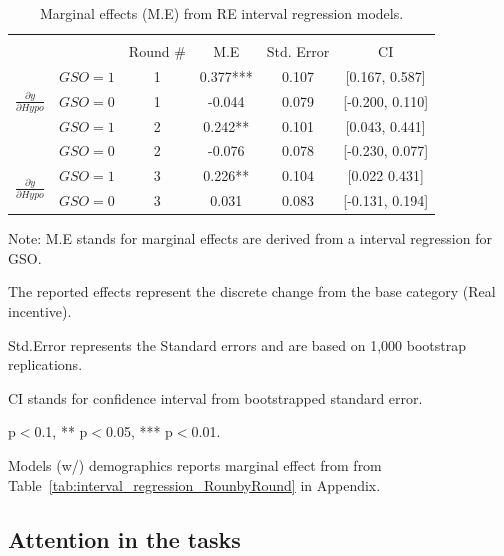\documentclass[12pt]{article}
\begin{document}
\begin{table}[H]
\centering
\footnotesize
\caption{Marginal effects (M.E) from RE interval regression models.}
\label{tab: Learning10}
\begin{tabular}{llcccc}
\toprule
 & &  \\
 & &Round \#& M.E & Std. Error & CI \\ \midrule
{}& $GSO=1$ &  1&0.377*** &  0.107& [0.167, 0.587] \\ & $GSO=0$ &  1& -0.044 & 0.079 & [-0.200, 0.110] \\
                                            \midrule
{} & $GSO=1$ & 2 &0.242** & 0.101 & [0.043, 0.441] \\  & $GSO=0$ &  2 & -0.076& 0.078& [-0.230, 0.077] \\
                                       
                                      \midrule
{}& $GSO=1$ & 3&0.226** & 0.104 & [0.022 0.431] \\  & $GSO=0$ &  3&0.031 & 0.083 & [-0.131, 0.194] \\
                                                     
                             \bottomrule
\end{tabular}
\begin{tablenotes}
\footnotesize
\item Note: M.E stands for marginal effects are derived from a interval regression for GSO.
\item The reported effects represent the discrete change from the base category (Real incentive).
\item Std.Error represents the Standard errors and  are based on 1,000 bootstrap replications.
\item CI stands for confidence interval from bootstrapped standard error.
\item * p$<$0.1, ** p$<$0.05, *** p$<$0.01.
\item Models (w/) demographics reports marginal effect from  from Table~\ref{tab:interval_regression_RounbyRound} in Appendix.
\end{tablenotes}
\end{table}




\subsection{Attention in the tasks}
\label{Sec: Attention}
\end{document}
